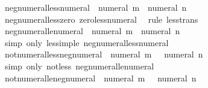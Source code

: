 \begin{isabellebody}
\endisatagproof
{\isafoldproof}%
%
\isadelimproof
\isanewline
%
\endisadelimproof
\isanewline
{}\isamarkupfalse%
\ neg{\isacharunderscore}{\kern0pt}numeral{\isacharunderscore}{\kern0pt}less{\isacharunderscore}{\kern0pt}numeral{\isacharcolon}{\kern0pt}\ {\isachardoublequoteopen}{\isacharminus}{\kern0pt}\ numeral\ m\ {\isacharless}{\kern0pt}\ numeral\ n{\isachardoublequoteclose}\isanewline
%
\isadelimproof
\ \ %
\endisadelimproof
%
\isatagproof
{}\isamarkupfalse%
\ neg{\isacharunderscore}{\kern0pt}numeral{\isacharunderscore}{\kern0pt}less{\isacharunderscore}{\kern0pt}zero\ zero{\isacharunderscore}{\kern0pt}less{\isacharunderscore}{\kern0pt}numeral\ \isamarkupfalse%
\ {\isacharparenleft}{\kern0pt}rule\ less{\isacharunderscore}{\kern0pt}trans{\isacharparenright}{\kern0pt}%
\endisatagproof
{\isafoldproof}%
%
\isadelimproof
\isanewline
%
\endisadelimproof
\isanewline
{}\isamarkupfalse%
\ neg{\isacharunderscore}{\kern0pt}numeral{\isacharunderscore}{\kern0pt}le{\isacharunderscore}{\kern0pt}numeral{\isacharcolon}{\kern0pt}\ {\isachardoublequoteopen}{\isacharminus}{\kern0pt}\ numeral\ m\ {\isasymle}\ numeral\ n{\isachardoublequoteclose}\isanewline
%
\isadelimproof
\ \ %
\endisadelimproof
%
\isatagproof
{}\isamarkupfalse%
\ {\isacharparenleft}{\kern0pt}simp\ only{\isacharcolon}{\kern0pt}\ less{\isacharunderscore}{\kern0pt}imp{\isacharunderscore}{\kern0pt}le\ neg{\isacharunderscore}{\kern0pt}numeral{\isacharunderscore}{\kern0pt}less{\isacharunderscore}{\kern0pt}numeral{\isacharparenright}{\kern0pt}%
\endisatagproof
{\isafoldproof}%
%
\isadelimproof
\isanewline
%
\endisadelimproof
\isanewline
{}\isamarkupfalse%
\ not{\isacharunderscore}{\kern0pt}numeral{\isacharunderscore}{\kern0pt}less{\isacharunderscore}{\kern0pt}neg{\isacharunderscore}{\kern0pt}numeral{\isacharcolon}{\kern0pt}\ {\isachardoublequoteopen}{\isasymnot}\ numeral\ m\ {\isacharless}{\kern0pt}\ {\isacharminus}{\kern0pt}\ numeral\ n{\isachardoublequoteclose}\isanewline
%
\isadelimproof
\ \ %
\endisadelimproof
%
\isatagproof
{}\isamarkupfalse%
\ {\isacharparenleft}{\kern0pt}simp\ only{\isacharcolon}{\kern0pt}\ not{\isacharunderscore}{\kern0pt}less\ neg{\isacharunderscore}{\kern0pt}numeral{\isacharunderscore}{\kern0pt}le{\isacharunderscore}{\kern0pt}numeral{\isacharparenright}{\kern0pt}%
\endisatagproof
{\isafoldproof}%
%
\isadelimproof
\isanewline
%
\endisadelimproof
\isanewline
{}\isamarkupfalse%
\ not{\isacharunderscore}{\kern0pt}numeral{\isacharunderscore}{\kern0pt}le{\isacharunderscore}{\kern0pt}neg{\isacharunderscore}{\kern0pt}numeral{\isacharcolon}{\kern0pt}\ {\isachardoublequoteopen}{\isasymnot}\ numeral\ m\ {\isasymle}\ {\isacharminus}{\kern0pt}\ numeral\ n{\isachardoublequoteclose}\isanewline

\end{isabellebody}
